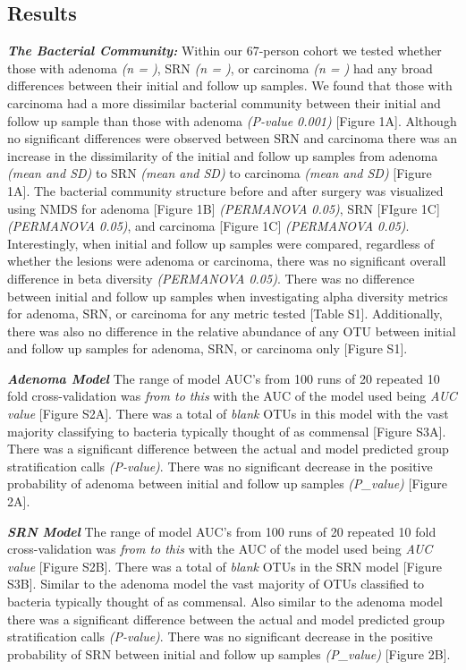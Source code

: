 \documentclass[12pt,]{article}
\begin{document}
\newpage

\subsection{Results}\label{results}

\textbf{\emph{The Bacterial Community:}} Within our 67-person cohort we
tested whether those with adenoma \emph{(n = )}, SRN \emph{(n = )}, or
carcinoma \emph{(n = )} had any broad differences between their initial
and follow up samples. We found that those with carcinoma had a more
dissimilar bacterial community between their initial and follow up
sample than those with adenoma \emph{(P-value 0.001)} {[}Figure 1A{]}.
Although no significant differences were observed between SRN and
carcinoma there was an increase in the dissimilarity of the initial and
follow up samples from adenoma \emph{(mean and SD)} to SRN \emph{(mean
and SD)} to carcinoma \emph{(mean and SD)} {[}Figure 1A{]}. The
bacterial community structure before and after surgery was visualized
using NMDS for adenoma {[}Figure 1B{]} \emph{(PERMANOVA 0.05)}, SRN
{[}FIgure 1C{]} \emph{(PERMANOVA 0.05)}, and carcinoma {[}Figure 1C{]}
\emph{(PERMANOVA 0.05)}. Interestingly, when initial and follow up
samples were compared, regardless of whether the lesions were adenoma or
carcinoma, there was no significant overall difference in beta diversity
\emph{(PERMANOVA 0.05)}. There was no difference between initial and
follow up samples when investigating alpha diversity metrics for
adenoma, SRN, or carcinoma for any metric tested {[}Table S1{]}.
Additionally, there was also no difference in the relative abundance of
any OTU between initial and follow up samples for adenoma, SRN, or
carcinoma only {[}Figure S1{]}.

\textbf{\emph{Adenoma Model}} The range of model AUC's from 100 runs of
20 repeated 10 fold cross-validation was \emph{from to this} with the
AUC of the model used being \emph{AUC value} {[}Figure S2A{]}. There was
a total of \emph{blank} OTUs in this model with the vast majority
classifying to bacteria typically thought of as commensal {[}Figure
S3A{]}. There was a significant difference between the actual and model
predicted group stratification calls \emph{(P-value)}. There was no
significant decrease in the positive probability of adenoma between
initial and follow up samples \emph{(P\_value)} {[}Figure 2A{]}.

\textbf{\emph{SRN Model}} The range of model AUC's from 100 runs of 20
repeated 10 fold cross-validation was \emph{from to this} with the AUC
of the model used being \emph{AUC value} {[}Figure S2B{]}. There was a
total of \emph{blank} OTUs in the SRN model {[}Figure S3B{]}. Similar to
the adenoma model the vast majority of OTUs classified to bacteria
typically thought of as commensal. Also similar to the adenoma model
there was a significant difference between the actual and model
predicted group stratification calls \emph{(P-value)}. There was no
significant decrease in the positive probability of SRN between initial
and follow up samples \emph{(P\_value)} {[}Figure 2B{]}.
\end{document}
